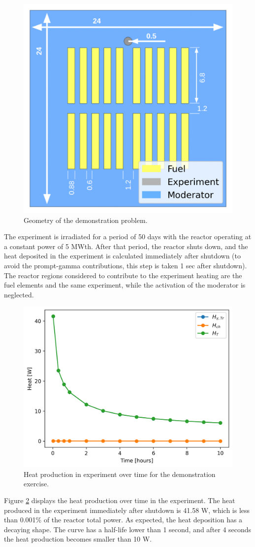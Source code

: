 \begin{figure}[htbp!] %
    \centering
    \includegraphics[width=0.50\linewidth]{figures/neutronics2-geo-legend}
    \hfill
    \caption{Geometry of the demonstration problem.}
    \label{fig:toy-geo}
\end{figure}

The experiment is irradiated for a period of 50 days with the reactor operating at a constant power of 5 MWth.
After that period, the reactor shuts down, and the heat deposited in the experiment is calculated immediately after shutdown (to avoid the prompt-gamma contributions, this step is taken 1 sec after shutdown).
The reactor regions considered to contribute to the experiment heating are the fuel elements and the same experiment, while the activation of the moderator is neglected.


\begin{figure}[htbp!] %
    \centering
    \includegraphics[width=0.55\linewidth]{figures/reference-decay-over-time}
    \hfill
    \caption{Heat production in experiment over time for the demonstration exercise.}
    \label{fig:demo-time}
\end{figure}

Figure \ref{fig:demo-time} displays the heat production over time in the experiment.
The heat produced in the experiment immediately after shutdown is 41.58 W, which is less than 0.001\% of the reactor total power.
As expected, the heat deposition has a decaying shape.
The curve has a half-life lower than 1 second, and after 4 seconds the heat production becomes smaller than 10 W.

